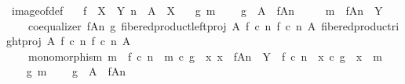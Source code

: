 \begin{isabellebody}
\isanewline
{}\isamarkupfalse%
\ image{\isacharunderscore}{\kern0pt}of{\isacharunderscore}{\kern0pt}def{}{\isacharcolon}{\kern0pt}\isanewline
\ \ \ {\isachardoublequoteopen}f\ {\isacharcolon}{\kern0pt}\ X\ {\isasymrightarrow}\ Y{\isachardoublequoteclose}\ {\isachardoublequoteopen}n\ {\isacharcolon}{\kern0pt}\ A\ {\isasymrightarrow}\ X{\isachardoublequoteclose}\isanewline
\ \ \ {\isachardoublequoteopen}{\isasymexists}g\ m{\isachardot}{\kern0pt}\isanewline
\ \ \ \ g\ {\isacharcolon}{\kern0pt}\ A\ {\isasymrightarrow}\ f{\isasymlparr}A{\isasymrparr}\isactrlbsub n\isactrlesub \ {\isasymand}\isanewline
\ \ \ \ m\ {\isacharcolon}{\kern0pt}\ f{\isasymlparr}A{\isasymrparr}\isactrlbsub n\isactrlesub \ {\isasymrightarrow}\ Y\ {\isasymand}\isanewline
\ \ \ \ coequalizer\ {\isacharparenleft}{\kern0pt}f{\isasymlparr}A{\isasymrparr}\isactrlbsub n\isactrlesub {\isacharparenright}{\kern0pt}\ g\ {\isacharparenleft}{\kern0pt}fibered{\isacharunderscore}{\kern0pt}product{\isacharunderscore}{\kern0pt}left{\isacharunderscore}{\kern0pt}proj\ A\ {\isacharparenleft}{\kern0pt}f\ {\isasymcirc}\isactrlsub c\ n{\isacharparenright}{\kern0pt}\ {\isacharparenleft}{\kern0pt}f\ {\isasymcirc}\isactrlsub c\ n{\isacharparenright}{\kern0pt}\ A{\isacharparenright}{\kern0pt}\ {\isacharparenleft}{\kern0pt}fibered{\isacharunderscore}{\kern0pt}product{\isacharunderscore}{\kern0pt}right{\isacharunderscore}{\kern0pt}proj\ A\ {\isacharparenleft}{\kern0pt}f\ {\isasymcirc}\isactrlsub c\ n{\isacharparenright}{\kern0pt}\ {\isacharparenleft}{\kern0pt}f\ {\isasymcirc}\isactrlsub c\ n{\isacharparenright}{\kern0pt}\ A{\isacharparenright}{\kern0pt}\ {\isasymand}\isanewline
\ \ \ \ monomorphism\ m\ {\isasymand}\ f\ {\isasymcirc}\isactrlsub c\ n\ {\isacharequal}{\kern0pt}\ m\ {\isasymcirc}\isactrlsub c\ g\ {\isasymand}\ {\isacharparenleft}{\kern0pt}{\isasymforall}x{\isachardot}{\kern0pt}\ x\ {\isacharcolon}{\kern0pt}\ f{\isasymlparr}A{\isasymrparr}\isactrlbsub n\isactrlesub \ {\isasymrightarrow}\ Y\ {\isasymlongrightarrow}\ f\ {\isasymcirc}\isactrlsub c\ n\ {\isacharequal}{\kern0pt}\ x\ {\isasymcirc}\isactrlsub c\ g\ {\isasymlongrightarrow}\ x\ {\isacharequal}{\kern0pt}\ m{\isacharparenright}{\kern0pt}{\isachardoublequoteclose}\isanewline
%
\isadelimproof
%
\endisadelimproof
%
\isatagproof
{}\isamarkupfalse%
\ {\isacharminus}{\kern0pt}\isanewline
\ \ \isamarkupfalse%
\ {\isachardoublequoteopen}{\isasymexists}g\ m{\isachardot}{\kern0pt}\isanewline
\ \ \ \ g\ {\isacharcolon}{\kern0pt}\ A\ {\isasymrightarrow}\ f{\isasymlparr}A{\isasymrparr}\isactrlbsub n\isactrlesub \ {\isasymand}\isanewline

\end{isabellebody}
